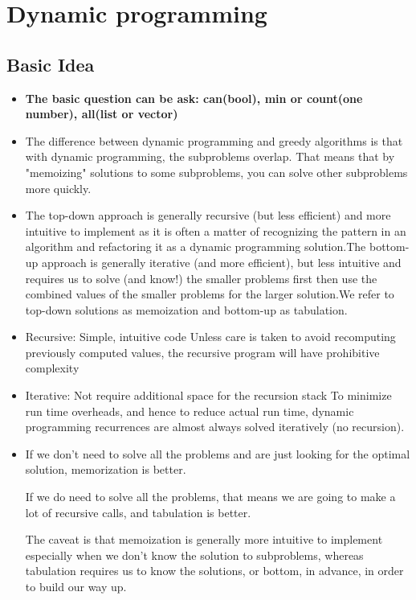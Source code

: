 \documentclass[a4paper,11pt,twoside]{book}
\begin{document}
\section{Dynamic programming}
\subsection{Basic Idea}
\begin{itemize}
	
\item \textbf{The basic question can be ask: can(bool), min or count(one number), all(list or vector)}
	
\item The difference between dynamic programming and greedy algorithms is that with dynamic programming, the subproblems overlap. That means that by "memoizing" solutions to some subproblems, you can solve other subproblems more quickly.   


\item The top-down approach is generally recursive (but less efficient) and more intuitive to implement as it is often a matter of recognizing the pattern in an algorithm and refactoring it as a dynamic programming solution.The bottom-up approach is generally iterative (and more efficient), but less intuitive and requires us to solve (and know!) the smaller problems first then use the combined values of the smaller problems for the larger solution.We refer to top-down solutions as memoization and bottom-up as tabulation.

\item Recursive: Simple, intuitive code
Unless care is taken to avoid recomputing previously computed values, the recursive program will have prohibitive complexity

\item Iterative: Not require additional space for the recursion stack
To minimize run time overheads, and hence to reduce actual run time, dynamic programming recurrences are almost always solved iteratively    (no recursion).

\item If we don’t need to solve all the problems and are just looking for the optimal solution, memorization is better.

If we do need to solve all the problems, that means we are going to make a lot of recursive calls, and tabulation is better.

The caveat is that memoization is generally more intuitive to implement especially when we don’t know the solution to subproblems, whereas tabulation requires us to know the solutions, or bottom, in advance, in order to build our way up.


\end{itemize}
\end{document}

